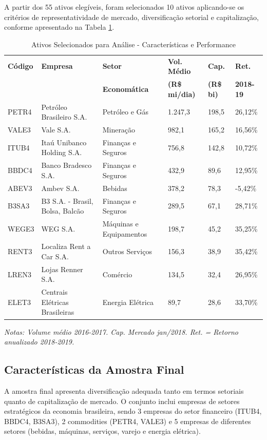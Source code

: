 A partir dos 55 ativos elegíveis, foram selecionados 10 ativos aplicando-se os critérios de representatividade de mercado, diversificação setorial e capitalização, conforme apresentado na Tabela \ref{tab:ativos_selecionados_performance}.

\begin{table}[H]
\centering
\caption{Ativos Selecionados para Análise - Características e Performance}
\begin{tabular}{|p{1.5cm}|p{4.5cm}|p{2.5cm}|p{1.8cm}|p{1.5cm}|p{1.3cm}|}
\hline
\textbf{Código} & \textbf{Empresa} & \textbf{Setor} & \textbf{Vol. Médio} & \textbf{Cap.} & \textbf{Ret.} \\
& & \textbf{Economática} & \textbf{(R\$ mi/dia)} & \textbf{(R\$ bi)} & \textbf{2018-19} \\
\hline
PETR4 & Petróleo Brasileiro S.A. & Petróleo e Gás & 1.247,3 & 198,5 & 26,12\% \\
\hline
VALE3 & Vale S.A. & Mineração & 982,1 & 165,2 & 16,56\% \\
\hline
ITUB4 & Itaú Unibanco Holding S.A. & Finanças e Seguros & 756,8 & 142,8 & 10,72\% \\
\hline
BBDC4 & Banco Bradesco S.A. & Finanças e Seguros & 432,9 & 89,6 & 12,95\% \\
\hline
ABEV3 & Ambev S.A. & Bebidas & 378,2 & 78,3 & -5,42\% \\
\hline
B3SA3 & B3 S.A. - Brasil, Bolsa, Balcão & Finanças e Seguros & 289,5 & 67,1 & 28,71\% \\
\hline
WEGE3 & WEG S.A. & Máquinas e Equipamentos & 198,7 & 45,2 & 35,25\% \\
\hline
RENT3 & Localiza Rent a Car S.A. & Outros Serviços & 156,3 & 38,9 & 35,42\% \\
\hline
LREN3 & Lojas Renner S.A. & Comércio & 134,5 & 32,4 & 26,95\% \\
\hline
ELET3 & Centrais Elétricas Brasileiras & Energia Elétrica & 89,7 & 28,6 & 33,70\% \\
\hline
\end{tabular}
\textit{Notas: Volume médio 2016-2017. Cap. Mercado jan/2018. Ret. = Retorno anualizado 2018-2019.}
\label{tab:ativos_selecionados_performance}
\end{table}

\subsection{Características da Amostra Final}

A amostra final apresenta diversificação adequada tanto em termos setoriais quanto de capitalização de mercado. O conjunto inclui empresas de setores estratégicos da economia brasileira, sendo 3 empresas do setor financeiro (ITUB4, BBDC4, B3SA3), 2 commodities (PETR4, VALE3) e 5 empresas de diferentes setores (bebidas, máquinas, serviços, varejo e energia elétrica).

